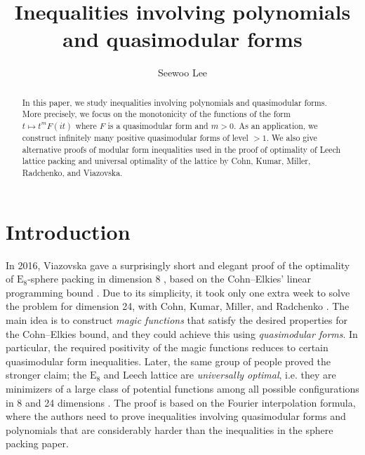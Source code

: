 \documentclass[10pt,reqno]{amsproc}
\title{Inequalities involving polynomials and quasimodular forms}
\author{Seewoo Lee}
\date{}
\newcommand{\rE}{\mathrm{E}}
\newcommand{\1}{\mathds{1}}	%
\theoremstyle{definition}
\theoremstyle{remark}
\begin{document}
\maketitle

\begin{abstract}
In this paper, we study inequalities involving polynomials and quasimodular forms.
More precisely, we focus on the monotonicity of the functions of the form $t \mapsto t^m F(it)$ where $F$ is a quasimodular form and $m > 0$.
As an application, we construct infinitely many positive quasimodular forms of level $> 1$.
We also give alternative proofs of modular form inequalities used in the proof of optimality of Leech lattice packing and universal optimality of the lattice by Cohn, Kumar, Miller, Radchenko, and Viazovska.
\end{abstract}

\section{Introduction}

In 2016, Viazovska gave a surprisingly short and elegant proof of the optimality of $\rE_8$-sphere packing in dimension $8$ \cite{viazovska2017sphere}, based on the Cohn--Elkies' linear programming bound \cite{cohn2003new}.
Due to its simplicity, it took only one extra week to solve the problem for dimension 24, with Cohn, Kumar, Miller, and Radchenko \cite{cohn2017sphere}.
The main idea is to construct \emph{magic functions} that satisfy the desired properties for the Cohn--Elkies bound, and they could achieve this using \emph{quasimodular forms}.
In particular, the required positivity of the magic functions reduces to certain quasimodular form inequalities.
Later, the same group of people proved the stronger claim; the $\rE_8$ and Leech lattice are \emph{universally optimal}, i.e. they are minimizers of a large class of potential functions among all possible configurations in 8 and 24 dimensions \cite{cohn2022universal}.
The proof is based on the Fourier interpolation formula, where the authors need to prove inequalities involving quasimodular forms and polynomials that are considerably harder than the inequalities in the sphere packing paper.
\end{document}
